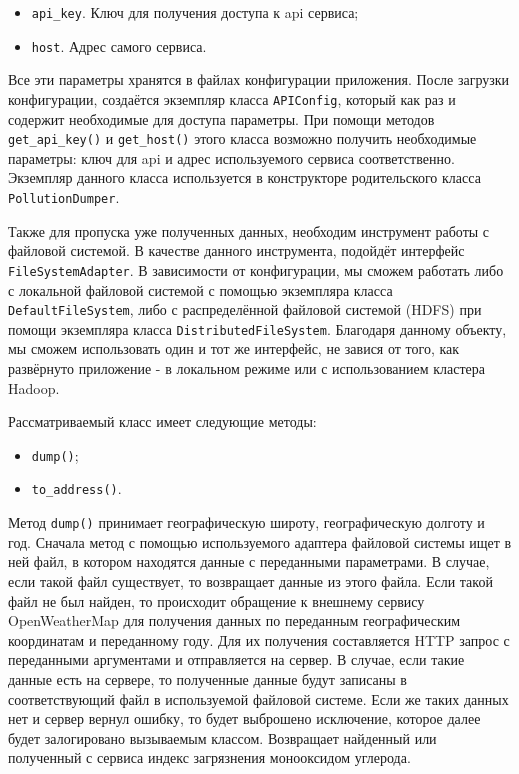 \begin{itemize}
\item \texttt{api\_key}. Ключ для получения доступа к api сервиса;
\item \texttt{host}. Адрес самого сервиса.
\end{itemize}

Все эти параметры хранятся в файлах конфигурации приложения.
После загрузки конфигурации, создаётся экземпляр класса \texttt{APIConfig}, который как раз и содержит необходимые для доступа параметры.
При помощи методов \texttt{get\_api\_key()} и \texttt{get\_host()} этого класса возможно получить необходимые параметры: ключ для api и адрес используемого сервиса соответственно.
Экземпляр данного класса используется в конструкторе родительского класса \texttt{PollutionDumper}.

Также для пропуска уже полученных данных, необходим инструмент работы с файловой системой.
В качестве данного инструмента, подойдёт интерфейс \texttt{FileSystemAdapter}.
В зависимости от конфигурации, мы сможем работать либо с локальной файловой системой с помощью экземпляра класса \texttt{DefaultFileSystem}, либо с распределённой файловой системой (HDFS) при помощи экземпляра класса \texttt{DistributedFileSystem}.
Благодаря данному объекту, мы сможем использовать один и тот же интерфейс, не завися от того, как развёрнуто приложение - в локальном режиме или с использованием кластера Hadoop.

Рассматриваемый класс имеет следующие методы:
\begin{itemize}
\item \texttt{dump()};
\item \texttt{to\_address()}.
\end{itemize}

Метод \texttt{dump()} принимает географическую широту, географическую долготу и год.
Сначала метод с помощью используемого адаптера файловой системы ищет в ней файл, в котором находятся данные с переданными параметрами.
В случае, если такой файл существует, то возвращает данные из этого файла.
Если такой файл не был найден, то происходит обращение к внешнему сервису OpenWeatherMap для получения данных по переданным географическим координатам и переданному году.
Для их получения составляется HTTP запрос с переданными аргументами и отправляется на сервер.
В случае, если такие данные есть на сервере, то полученные данные будут записаны в соответствующий файл в используемой файловой системе.
Если же таких данных нет и сервер вернул ошибку, то будет выброшено исключение, которое далее будет залогировано вызываемым классом.
Возвращает найденный или полученный с сервиса индекс загрязнения монооксидом углерода.

